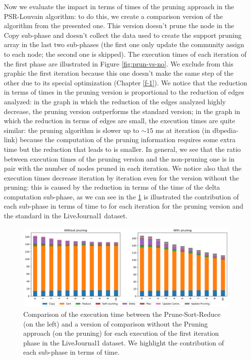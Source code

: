 \noindent Now we evaluate the impact in terms of times of the pruning approach in the PSR-Louvain algorithm: to do this, we create a comparison version of the algorithm from the presented one. This version doesn't prune the node in the Copy sub-phase and doesn't collect the data used to create the support pruning array in the last two sub-phases (the first one only update the community assign to each node; the second one is skipped). The execution times of each iteration of the first phase are illustrated in Figure \ref{fig:prun-vs-no}. We exclude from this graphic the first iteration because this one doesn't make the same step of the other due to its special optimization (Chapter \ref{f-1}). We notice that the reduction in terms of times in the pruning version is proportional to the reduction of edges analyzed: in the graph in which the reduction of the edges analyzed highly decrease, the pruning version outperforms the standard version; in the graph in which the reduction in terms of edges are small, the execution times are quite similar: the pruning algorithm is slower up to $\sim15$ ms at iteration (in dbpedia-link) because the computation of the pruning information requires some extra time but the reduction that leads to is smaller. In general, we see that the ratio between execution times of the pruning version and the non-pruning one is in pair with the number of nodes pruned in each iteration. We notice also that the execution times decrease iteration by iteration even for the version without the pruning: this is caused by the reduction in terms of the time of the delta computation sub-phase, as we can see in the \ref{fig:livejournal-comparison} is illustrated the contribution of each sub-phase in terms of time to for each iteration for the pruning version and the standard in the LiveJournal1 dataset.
\begin{figure}
	\centering
	\includegraphics[width=1\linewidth]{0-resources/livejournal-comparison-sort.png}
	\caption{Comparison of the execution time between the Prune-Sort-Reduce (on the left) and a version of comparison without the Pruning approach (on the pruning) for each execution of the first iteration phase in the LiveJournal1 dataset. We highlight the contribution of each sub-phase in terms of time.}
	\label{fig:livejournal-comparison}
\end{figure}
